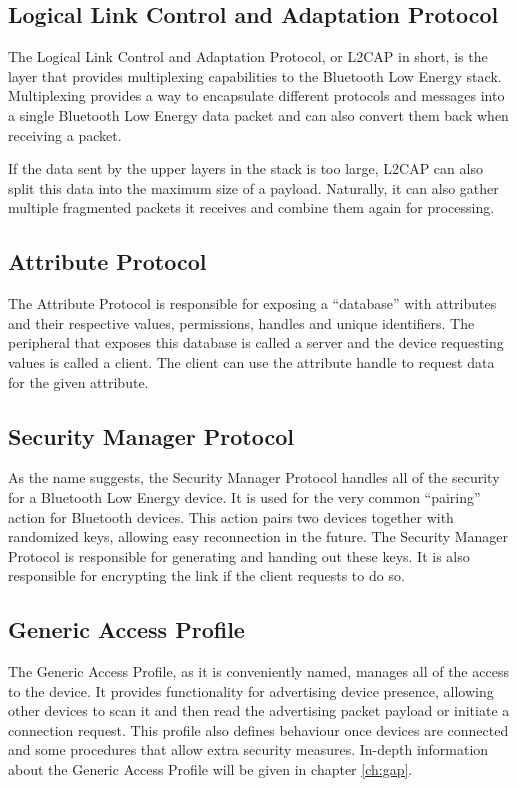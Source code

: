 \documentclass[pdftex,a4paper,12pt,twoside]{report}
\begin{document}
\subsection{Logical Link Control and Adaptation Protocol}
\label{subsec:hostL2CAP}
The Logical Link Control and Adaptation Protocol, or L2CAP in short, is the layer that provides multiplexing capabilities to the Bluetooth Low Energy stack. Multiplexing provides a way to encapsulate different protocols and messages into a single Bluetooth Low Energy data packet and can also convert them back when receiving a packet.

If the data sent by the upper layers in the stack is too large, L2CAP can also split this data into the maximum size of a payload. Naturally, it can also gather multiple fragmented packets it receives and combine them again for processing.

\subsection{Attribute Protocol}
\label{subsec:hostATT}
The Attribute Protocol is responsible for exposing a ``database'' with attributes and their respective values, permissions, handles and unique identifiers. The peripheral that exposes this database is called a server and the device requesting values is called a client. The client can use the attribute handle to request data for the given attribute.

\subsection{Security Manager Protocol}
\label{subsec:hostSMP}
As the name suggests, the Security Manager Protocol handles all of the security for a Bluetooth Low Energy device. It is used for the very common ``pairing'' action for Bluetooth devices. This action pairs two devices together with randomized keys, allowing easy reconnection in the future. The Security Manager Protocol is responsible for generating and handing out these keys. It is also responsible for encrypting the link if the client requests to do so.

\subsection{Generic Access Profile}
\label{subsec:hostGAP}
The Generic Access Profile, as it is conveniently named, manages all of the access to the device. It provides functionality for advertising device presence, allowing other devices to scan it and then read the advertising packet payload or initiate a connection request. This profile also defines behaviour once devices are connected and some procedures that allow extra security measures. In-depth information about the Generic Access Profile will be given in chapter \ref{ch:gap}.
\end{document}
